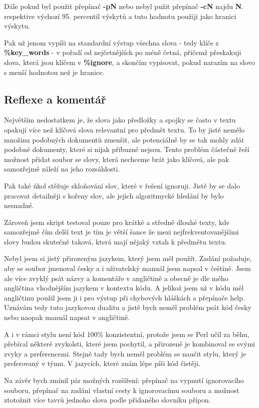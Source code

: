 \documentclass{article}
\def\cmd{\fontfamily{lmtt}\selectfont\textbf} %
\begin{document}
\par Dále pokud byl použit přepínač {\cmd {-pN}} nebo
nebyl pužit přepínač {\cmd {-cN}} najdu
{\cmd N}. respektive výchozí 95. percentil výskytů a
tuto hodnotu použiji jako hranici výskytu.

\par Pak už jenom vypíši na standardní výstup všechna slova
- tedy klíče z {\cmd {\%key\_words}} - v pořadí od nejčetnějších
po méně četná, přičemž přeskakuji slova, která jsou
klíčem v {\cmd {\%ignore}}, a skončím vypisovat, pokud narazím
na slovo s menší hodnotou než je hranice.

\subsection*{Reflexe a komentář}
\indent
\par Největším nedostatkem je, že slova jako předložky a spojky se často
v textu opakují více než klíčová slova relevantní pro předmět textu.
To by jistě nemělo množinu podobných dokumentů zmenšit, ale potenciálně
by se tak mohly  zdát podobné dokumenty, které si nijak příbuzné
nejsou. Tento problém částečně řeší možnost přidat soubor se slovy,
která nechceme brát jako klíčová, ale pak samozřejmě záleží na
jeho rozsáhlosti.

\par Pak také úkol stěžuje skloňování slov, které v řešení ignoruji.
Jistě by se dalo pracovat detailněji s kořeny slov, ale jejich
algoritmycké hledání by bylo nesnadné.

\par Zároveň jsem skript testoval pouze pro krátké a středně
dlouhé texty, kde samozřejmě čím delší text je tím je větší šance
že mezi nejfrekventovanějšími slovy budou skutečně taková,
která mají nějaký vztah k předmětu textu.

\par Nebyl jsem si jistý přirozeným jazykem, který jsem měl použít.
Zadání požaduje, aby se soubor jmenoval česky a i uživatelský
manuál jsem napsal v češtině. Jsem ale více zvyklý psát názvy a
komentáře v angličtině a obecně je dle mého angličtina vhodnějším
jazykem v kontextu kódu. A jelikož jsem už v kódu měl angličtinu
použil jsem ji i pro výstup při chybových hláškách a přepínače help.
Uznávám tedy tuto jazykovou dualitu a jistě bych neměl problém
psát kód česky nebo naopak manuál napsat v angličtině.

\par A i v rámci stylu není kód 100\% konzistentní, protože jsem
se Perl učil za běhu, přebíral některé zvykolsti, které jsem
pochytil, a přirozeně je kombinoval se svými zvyky a preferencemi.
Stejně tady bych neměl problém se naučit stylu, který je preferovaný
v týmu. V jazycích, které znám lépe píši kód čistěji.

\par Na závěr bych zmínil pár možných rozšíření: přepínač na vypnutí
ignorovacího souboru, přepínač na zadání vlastní cesty k ignorovacímu
souboru a možnost ztotožnit více tavrů jednoho slova podle přidaného
slovníku přípon.
\end{document}
